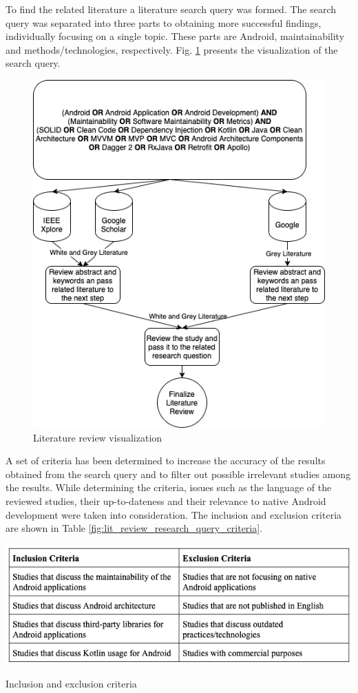 To find the related literature a literature search query was formed. The search query was separated into three parts to obtaining more successful findings, individually focusing on a single topic. These parts are Android, maintainability and methods/technologies, respectively. Fig. \ref{fig:lit_review_research_query} presents the visualization of the search query.
\begin{figure}[ht!] 
    \centering
    \includegraphics[scale=0.45]{figures/research_query.png}
    \caption{Literature review visualization}
    \label{fig:lit_review_research_query}
\end{figure}
\FloatBarrier

A set of criteria has been determined to increase the accuracy of the results obtained from the search query and to filter out possible irrelevant studies among the results. While determining the criteria, issues such as the language of the reviewed studies, their up-to-dateness and their relevance to native Android development were taken into consideration. The inclusion and exclusion criteria are shown in Table \ref{fig:lit_review_research_query_criteria}.
\begin{table}[htb]
    \centering
    \includegraphics[scale=0.5]{figures/research_query_criteria.png}
    \caption{Inclusion and exclusion criteria}
    \label{fig:lit_review_research_query_criteria}
\end{table}